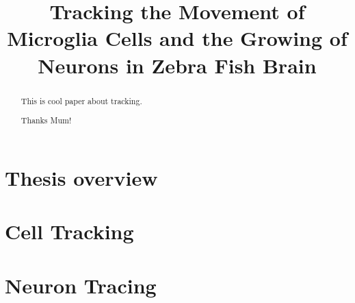 \documentclass[b5,12pt]{report}
\title{Tracking the Movement of Microglia Cells and the Growing of Neurons in Zebra Fish Brain}
\begin{document}
\maketitle
\begin{abstract}
 This is cool paper about tracking.
\end{abstract}
\renewcommand{\abstractname}{Acknowledgements}
\begin{abstract}
 Thanks Mum!
\end{abstract}

\tableofcontents
\listoffigures
\part{Thesis overview}

\part{Cell Tracking}
\part{Neuron Tracing}





\end{document}
